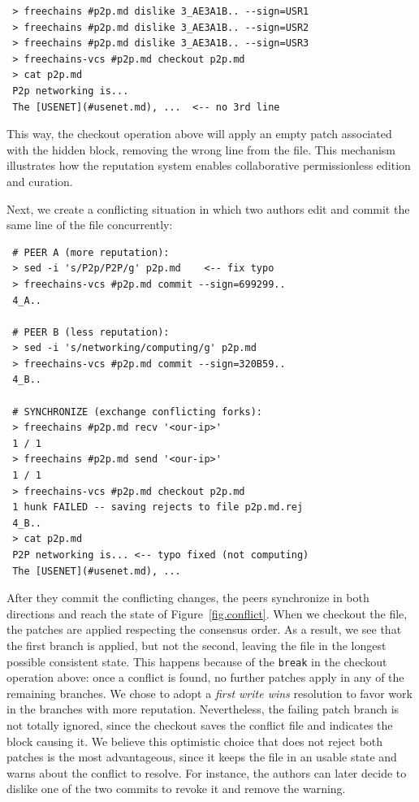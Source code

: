 \documentclass[10pt,journal,compsoc]{IEEEtran}
\begin{document}
{\footnotesize
\begin{verbatim}
 > freechains #p2p.md dislike 3_AE3A1B.. --sign=USR1
 > freechains #p2p.md dislike 3_AE3A1B.. --sign=USR2
 > freechains #p2p.md dislike 3_AE3A1B.. --sign=USR3
 > freechains-vcs #p2p.md checkout p2p.md
 > cat p2p.md
 P2p networking is...
 The [USENET](#usenet.md), ...  <-- no 3rd line
\end{verbatim}
}

This way, the checkout operation above will apply an empty patch associated
with the hidden block, removing the wrong line from the file.
This mechanism illustrates how the reputation system enables collaborative
permissionless edition and curation.

Next, we create a conflicting situation in which two authors edit and commit
the same line of the file concurrently:

{\footnotesize
\begin{verbatim}
 # PEER A (more reputation):
 > sed -i 's/P2p/P2P/g' p2p.md    <-- fix typo
 > freechains-vcs #p2p.md commit --sign=699299..
 4_A..

 # PEER B (less reputation):
 > sed -i 's/networking/computing/g' p2p.md
 > freechains-vcs #p2p.md commit --sign=320B59..
 4_B..

 # SYNCHRONIZE (exchange conflicting forks):
 > freechains #p2p.md recv '<our-ip>'
 1 / 1
 > freechains #p2p.md send '<our-ip>'
 1 / 1
 > freechains-vcs #p2p.md checkout p2p.md
 1 hunk FAILED -- saving rejects to file p2p.md.rej
 4_B..
 > cat p2p.md
 P2P networking is... <-- typo fixed (not computing)
 The [USENET](#usenet.md), ...
\end{verbatim}
}

After they commit the conflicting changes, the peers synchronize in both
directions and reach the state of Figure~\ref{fig.conflict}.
When we checkout the file, the patches are applied respecting the consensus
order.
As a result, we see that the first branch is applied, but not the second,
leaving the file in the longest possible consistent state.
%
This happens because of the \texttt{break} in the checkout operation above:
once a conflict is found, no further patches apply in any of the remaining
branches.
%
We chose to adopt a \emph{first write wins} resolution to favor work in the
branches with more reputation.
Nevertheless, the failing patch branch is not totally ignored, since the
checkout saves the conflict file and indicates the block causing it.
%
We believe this optimistic choice that does not reject both patches is the most
advantageous, since it keeps the file in an usable state and warns about the
conflict to resolve.
For instance, the authors can later decide to dislike one of the two commits to
revoke it and remove the warning.
\end{document}
